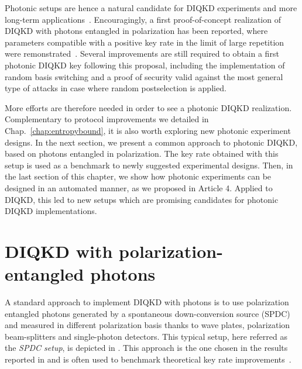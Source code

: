 \medbreak

Photonic setups are hence a natural candidate for DIQKD experiments and more long-term applications~\cite{Zapatero2023}.
Encouragingly, a first proof-of-concept realization of DIQKD with photons entangled in polarization has been reported, where parameters compatible with a positive key rate in the limit of large repetition were remonstrated~\cite{Liu2022}.
Several improvements are still required to obtain a first photonic DIQKD key following this proposal, including the implementation of random basis switching and a proof of security valid against the most general type of attacks in case where random postselection is applied. 

\medbreak

More efforts are therefore needed in order to see a photonic DIQKD realization. 
Complementary to protocol improvements we detailed in Chap.~\ref{chap:entropybound}, it is also worth exploring new photonic experiment designs.
In the next section, we present a common approach to photonic DIQKD, based on photons entangled in polarization.
The key rate obtained with this setup is used as a benchmark to newly suggested experimental designs.
Then, in the last section of this chapter, we show how photonic experiments can be designed in an automated manner, as we proposed in Article 4.
Applied to DIQKD, this led to new setups which are promising candidates for photonic DIQKD implementations.


\section{DIQKD with polarization-entangled photons}
\label{sec:PolarizationDIQKD}

A standard approach to implement DIQKD with photons is to use polarization entangled photons generated by a spontaneous down-conversion source (SPDC) and measured in different polarization basis thanks to wave plates, polarization beam-splitters and single-photon detectors.
This typical setup, here referred as the \textit{SPDC setup}, is depicted in .
This approach is the one chosen in the results reported in \cite{Liu2022} and is often used to benchmark theoretical key rate improvements~\cite{Ho2020,Sekatski2021}.

